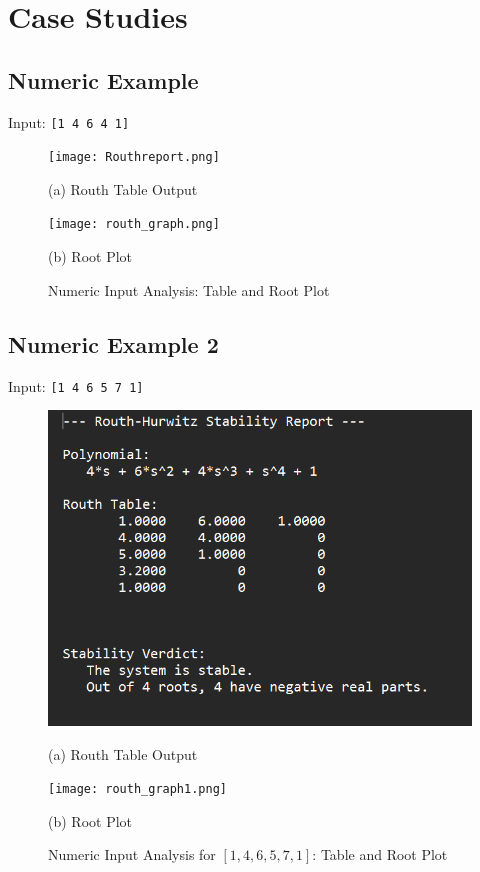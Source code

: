 \documentclass[11pt]{article}
\begin{document}
\section{Case Studies}
\subsection{Numeric Example}
Input: \texttt{[1 4 6 4 1]} \\

\begin{figure}[H]
  \centering
  \begin{minipage}[t]{0.49\textwidth}
    \centering
    \texttt{[image: Routhreport.png]}
    \caption*{(a) Routh Table Output}
  \end{minipage}
  \hfill
  \begin{minipage}[t]{0.49\textwidth}
    \centering
    \texttt{[image: routh\_graph.png]}
    \caption*{(b) Root Plot}
  \end{minipage}
  \caption{Numeric Input Analysis: Table and Root Plot}
  \label{fig:numeric_results}
\end{figure}

\newpage
\subsection{Numeric Example 2}
Input: \texttt{[1 4 6 5 7 1]} \\

\begin{figure}[H]
  \centering
  \begin{minipage}[t]{0.40\textwidth}
    \centering
    \includegraphics[width=\textwidth]{routh_report1.png}
    \caption*{(a) Routh Table Output}
  \end{minipage}
  \hfill
  \begin{minipage}[t]{0.49\textwidth}
    \centering
    \texttt{[image: routh\_graph1.png]}
    \caption*{(b) Root Plot}
  \end{minipage}
  \caption{Numeric Input Analysis for $[1, 4, 6, 5, 7, 1]$: Table and Root Plot}
  \label{fig:numeric_results_2}
\end{figure}
\end{document}
